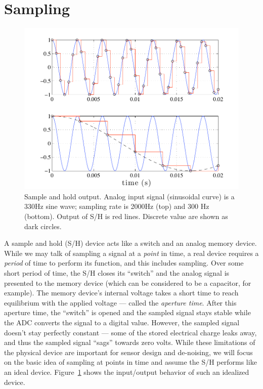 \section{Sampling}

\begin{figure}
\centerline{\includegraphics[width=\textwidth]{ch-computer/sampled}}
\caption[Sample and hold output]{Sample and hold
output. Analog input signal (sinusoidal curve) is a 330Hz sine wave; sampling
rate is 2000Hz (top) and 300 Hz (bottom). Output of S/H is red lines. Discrete value are shown as dark circles.\label{fg:sampled}}
\end{figure}

 A sample and hold
(S/H) device acts like a switch and an analog memory device. While we
may talk of sampling a signal at a \emph{point} in time, a real device
requires a \emph{period} of time to perform its function, and this
includes sampling.  Over some short period of time, the S/H closes its
``switch'' and the analog signal is presented to the memory device
(which can be considered to be a capacitor, for example). The memory
device's internal voltage takes a short time to reach equilibrium with
the applied voltage --- called the \emph{aperture time}. After this
aperture time, the ``switch'' is opened and the sampled signal stays
stable while the ADC converts the signal to a digital value. However,
the sampled signal doesn't stay perfectly constant --- some of the
stored electrical charge leaks away, and thus the sampled signal
``sags'' towards zero volts.  While these limitations of the physical
device are important for sensor design and de-noising, we will focus
on the basic idea of sampling at points in time and assume the S/H
performs like an ideal device. Figure~\ref{fg:sampled} shows the
input/output behavior of such an idealized device.

